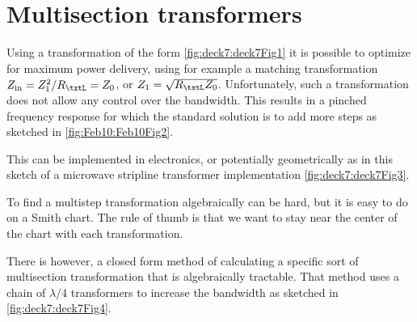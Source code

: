 %
%
\section{Multisection transformers}

Using a transformation of the form \cref{fig:deck7:deck7Fig1} it is possible to optimize for maximum power delivery, using for example a matching transformation \( Z_{\textrm{in}} = Z_1^2/R_\txtL = Z_0\), or \( Z_1 = \sqrt{R_\txtL Z_0} \).  Unfortunately, such a transformation does not allow any control over the bandwidth.  This results in a pinched frequency response for which the standard solution is to add more steps as sketched in \cref{fig:Feb10:Feb10Fig2}.




This can be implemented in electronics, or potentially geometrically as in this sketch of a microwave stripline transformer implementation \cref{fig:deck7:deck7Fig3}.


To find a multistep transformation algebraically can be hard, but it is easy to do on a Smith chart.  The rule of thumb is that we want to stay near the center of the chart with each transformation.

There is however, a closed form method of calculating a specific sort of multisection transformation that is algebraically tractable.  That method uses a chain of \( \lambda/4 \) transformers to increase the bandwidth as sketched in \cref{fig:deck7:deck7Fig4}.



